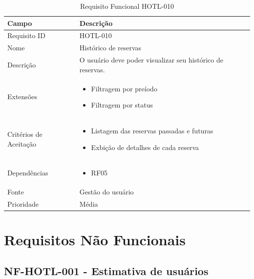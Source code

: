 \documentclass[
    12pt,
    oneside,
    a4paper,
    brazil
]{abntex2}
\begin{document}
\begin{table}[h]
	\begin{tabular}{|l|p{10cm}|}
		\hline
		\textbf{Campo} & \textbf{Descrição} \\
		\hline
		Requisito ID & HOTL-010 \\
		\hline
		Nome & Histórico de reservas\\
		\hline
		Descrição & O usuário deve poder visualizar seu histórico de reservas. \\
		\hline
		Extensões & \begin{itemize}[leftmargin=*, labelsep=0.5em, noitemsep, topsep=0pt]
		\item Filtragem por preíodo
		\item Filtragem por status
		\end{itemize} \\
		\hline
		Critérios de Aceitação & \begin{itemize}[leftmargin=*, labelsep=0.5em, noitemsep, topsep=0pt]
		\item Listagem das reservas passadas e futuras
		\item Exbição de detalhes de cada reserva
		\end{itemize} \\
		\hline
		Dependências & \begin{itemize}[leftmargin=*, labelsep=0.5em, noitemsep, topsep=0pt] 
		\item RF05
		\end{itemize} \\
		\hline
		Fonte & Gestão do usuário\\
		\hline
		Prioridade & Média \\
		\hline
	\end{tabular}
	\caption{Requisito Funcional HOTL-010}
\end{table}


\chapter{Requisitos Não Funcionais}

\section{NF-HOTL-001 - Estimativa de usuários}
\end{document}
